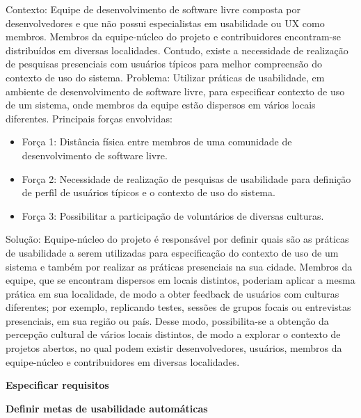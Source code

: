 Contexto: Equipe de desenvolvimento de software livre composta por desenvolvedores e que não possui especialistas em usabilidade ou UX como membros. Membros da equipe-núcleo do projeto e contribuidores encontram-se distribuídos em diversas localidades. Contudo, existe a necessidade de realização de pesquisas presenciais com usuários típicos para melhor compreensão do contexto de uso do sistema.
Problema: Utilizar práticas de usabilidade, em ambiente de desenvolvimento de software livre, para especificar contexto de uso de um sistema, onde membros da equipe estão dispersos em vários locais diferentes. Principais forças envolvidas:
\begin{itemize}
\item Força 1: Distância física entre membros de uma comunidade de desenvolvimento de software livre.
\item Força 2: Necessidade de realização de pesquisas de usabilidade para definição de perfil de usuários típicos e o contexto de uso do sistema.
\item Força 3: Possibilitar a participação de voluntários de diversas culturas.
\end{itemize}
Solução: Equipe-núcleo do projeto é responsável por definir quais são as práticas de usabilidade a serem utilizadas para especificação do contexto de uso de um sistema e também por realizar as práticas presenciais na sua cidade. Membros da equipe, que se encontram dispersos em locais distintos, poderiam aplicar a mesma prática em sua localidade, de modo a obter feedback de usuários com culturas diferentes; por exemplo, replicando testes, sessões de grupos focais ou entrevistas presenciais, em sua região ou país. Desse modo, possibilita-se a obtenção da percepção cultural de vários locais distintos, de modo a explorar o contexto de projetos abertos, no qual podem existir desenvolvedores, usuários, membros da equipe-núcleo e contribuidores em diversas localidades.


%
\textbf{Especificar requisitos}

\textbf{Definir metas de usabilidade automáticas}

